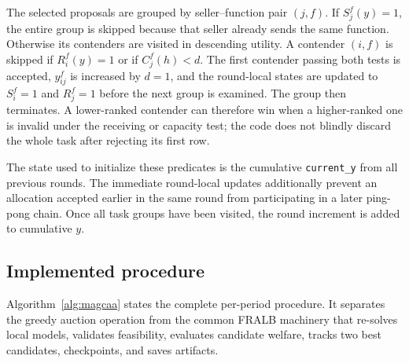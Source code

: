 The selected proposals are grouped by seller--function pair $(j,f)$. If
$S_j^f(y)=1$, the entire group is skipped because that seller already sends
the same function. Otherwise its contenders are visited in descending
utility. A contender $(i,f)$ is skipped if $R_i^f(y)=1$ or if
$C_j^f(h)<d$. The first contender passing both tests is accepted,
$y_{ij}^f$ is increased by $d=1$, and the round-local states are updated to
$S_i^f=1$ and $R_j^f=1$ before the next group is examined. The group then
terminates. A lower-ranked contender can therefore win when a higher-ranked
one is invalid under the receiving or capacity test; the code does not
blindly discard the whole task after rejecting its first row.

The state used to initialize these predicates is the cumulative
\texttt{current\_y} from all previous rounds. The immediate round-local
updates additionally prevent an allocation accepted earlier in the same
round from participating in a later ping-pong chain. Once all task groups
have been visited, the round increment is added to cumulative $y$.

\subsection{Implemented procedure}
\label{sec:magcaa-procedure}

Algorithm~\ref{alg:magcaa} states the complete per-period procedure. It
separates the greedy auction operation from the common FRALB machinery that
re-solves local models, validates feasibility, evaluates candidate welfare,
tracks two best candidates, checkpoints, and saves artifacts.

